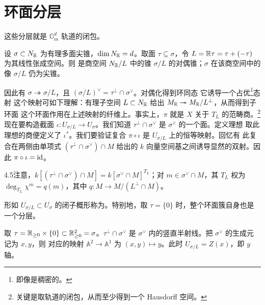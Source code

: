 \section{环面分层}
这些分层就是 $\mathbb G_m^d$ 轨道的闭包。
\begin{lemma}\label{lem:4.7}
设 $\sigma\subset N_{\mathbb R}$ 为有理多面尖锥，$\dim N_{\mathbb R}=d$。取面 $\tau\subseteq\sigma$，令 $L=\mathbb R\tau=\tau+(-\tau)$ 为其线性张成空间。则
是商空间 $N_{\mathbb R}/L$ 中的锥 $\sigma/L$ 的对偶锥；$\sigma$ 在该商空间中的像 $\sigma/L$ 仍为尖锥。
\end{lemma}
因此有 $\sigma\twoheadrightarrow\sigma/L$，且 $(\sigma/L)^\vee=\tau^\perp\cap\sigma^\vee$。对偶化得到环同态
它诱导一个占优\footnote{即像是稠密的。}态射
这个映射可如下理解：有理子空间 $L\subset N_{\mathbb R}$ 给出 $M_{\mathbb R}\twoheadrightarrow M_{\mathbb R}/L^\perp$，从而得到子环面
这个环面作用在上述映射的纤维上。事实上，$\pi$ 就是 $X$ 关于 $T_L$ 的范畴商。\footnote{关键是取轨道的闭包，从而至少得到一个 Hausdorff 空间。}
现在要构造截面 $\iota:U_{\sigma/L}\to U_\sigma$。我们知道 $\tau^\perp\cap\sigma^\vee$ 是 $\sigma^\vee$ 的一个面。定义理想
取此理想的商便定义了 $\iota^*$。我们要验证复合 $\pi\circ\iota$ 是 $U_{\sigma/L}$ 上的恒等映射。回忆有
此复合在两侧由单项式 $(\tau^\perp\cap\sigma^\vee)\cap M$ 给出的 $k$ 向量空间基之间诱导显然的双射。因此 $\pi\circ\iota=\operatorname{id}$。
\begin{Note}{4.5}注意，$k[(\tau^\perp\cap\sigma^\vee)\cap M]=k[\sigma^\vee\cap M]^{T_L}$；对 $m\in\sigma^\vee\cap M$，其 $T_L$ 权为 $\deg_{T_L}\chi^m=q(m)$，其中 $q:M\to M/(L^\perp\cap M)$。\end{Note}
\begin{definition}\label{def:4.6}
形如 $U_{\sigma/L}\subset U_\sigma$ 的闭子概形称为。特别地，取 $\tau=\{0\}$ 时，整个环面簇自身也是一个分层。
\end{definition}
\begin{example}\label{ex:4.8}
取 $\tau=\mathbb R_{\ge0}\times\{0\}\subset\mathbb R_{\ge0}^2=\sigma$。$\tau^\perp\cap\sigma^\vee$ 是 $\sigma^\vee$ 内的竖直半射线。把 $\sigma^\vee$ 的生成元记为 $x,y$，则
对应的映射 $\mathbb A^2\to\mathbb A^1$ 为 $(x,y)\mapsto y$。此时 $U_{\sigma/L}=Z(x)$，即 $y$ 轴。
\end{example}
